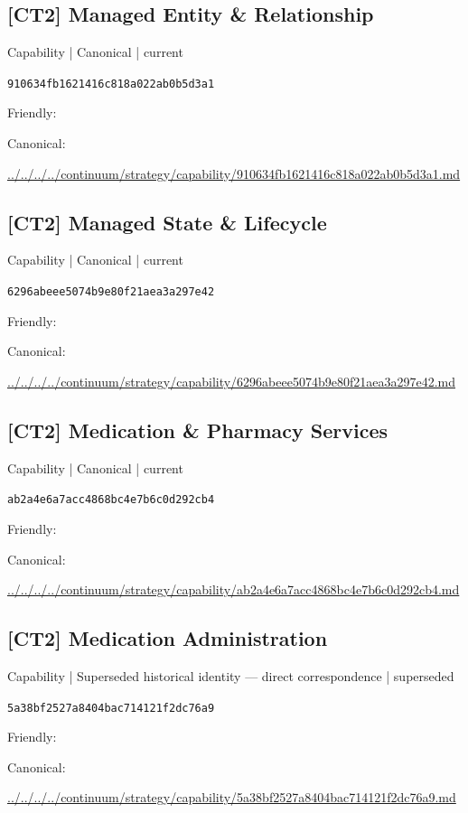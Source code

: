 \documentclass[10pt,a4paper]{article}
\begin{document}
\subsection*{[CT2] Managed Entity \& Relationship}
{\small Capability | Canonical | current}\par
\texttt{910634fb1621416c818a022ab0b5d3a1}\par
Friendly: \par
Canonical: \par
{\footnotesize\url{../../../../continuum/strategy/capability/910634fb1621416c818a022ab0b5d3a1.md}}\par
\subsection*{[CT2] Managed State \& Lifecycle}
{\small Capability | Canonical | current}\par
\texttt{6296abeee5074b9e80f21aea3a297e42}\par
Friendly: \par
Canonical: \par
{\footnotesize\url{../../../../continuum/strategy/capability/6296abeee5074b9e80f21aea3a297e42.md}}\par
\subsection*{[CT2] Medication \& Pharmacy Services}
{\small Capability | Canonical | current}\par
\texttt{ab2a4e6a7acc4868bc4e7b6c0d292cb4}\par
Friendly: \par
Canonical: \par
{\footnotesize\url{../../../../continuum/strategy/capability/ab2a4e6a7acc4868bc4e7b6c0d292cb4.md}}\par
\subsection*{[CT2] Medication Administration}
{\small Capability | Superseded historical identity — direct correspondence | superseded}\par
\texttt{5a38bf2527a8404bac714121f2dc76a9}\par
Friendly: \par
Canonical: \par
{\footnotesize\url{../../../../continuum/strategy/capability/5a38bf2527a8404bac714121f2dc76a9.md}}\par
\end{document}

